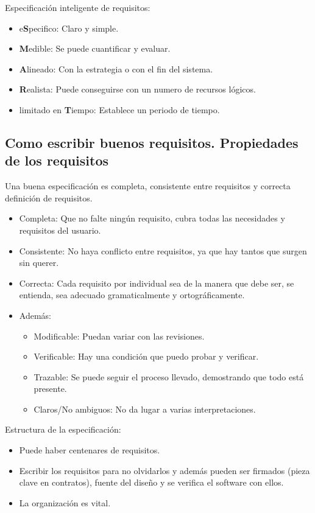 \documentclass[12pt, twoside, openright]{report} %
\begin{document}
Especificación inteligente de requisitos:
\begin{itemize}
	\item e\textbf{S}pecifico: Claro y simple.
	\item \textbf{M}edible: Se puede cuantificar y evaluar.
	\item \textbf{A}lineado: Con la estrategia o con el fin del sistema.
	\item \textbf{R}ealista: Puede conseguirse con un numero de recursos lógicos.
	\item limitado en \textbf{T}iempo: Establece un periodo de tiempo.
\end{itemize}
\pagebreak
\subsection{Como escribir buenos requisitos. Propiedades de los requisitos}



Una buena especificación es completa, consistente entre requisitos y
correcta definición de requisitos.

\begin{itemize}
	\item Completa: Que no falte ningún requisito, cubra todas las
	      necesidades y requisitos del usuario.
	\item Consistente: No haya conflicto entre requisitos, ya que hay tantos
	      que surgen sin querer.
	\item Correcta: Cada requisito por individual sea de la manera que debe
	      ser, se entienda, sea adecuado gramaticalmente y ortográficamente.
	\item Además:

	      \begin{itemize}
		      \item Modificable: Puedan variar con las revisiones.
		      \item Verificable: Hay una condición que puedo probar y verificar.
		      \item Trazable: Se puede seguir el proceso llevado, demostrando que
		            todo está presente.
		      \item Claros/No ambiguos: No da lugar a varias interpretaciones.
	      \end{itemize}
\end{itemize}

Estructura de la especificación:

\begin{itemize}
	\item Puede haber centenares de requisitos.
	\item Escribir los requisitos para no olvidarlos y además pueden ser
	      firmados (pieza clave en contratos), fuente del diseño y se
	      verifica el software con ellos.
	\item La organización es vital.
\end{itemize}
\end{document}

